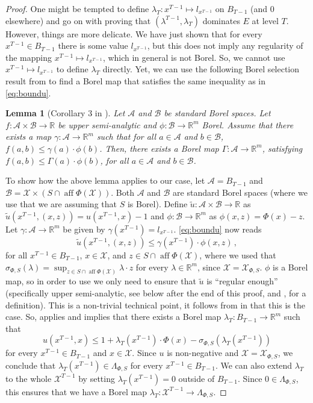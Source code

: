 \documentclass[10pt, a4paper]{article}
\newcommand{\A}{\mathcal A}
\newcommand{\B}{\mathcal B}
\newcommand{\LP}{\Lambda_{\Phi,S}}
\newcommand{\R}{\mathbb R}
\newcommand{\sP}{\sigma_{\Phi,S}}
\newcommand{\X}{\mathcal X}
\newcommand{\XP}{\X_{\Phi,S}}
\DeclareMathOperator{\aff}{aff}
\newtheorem{lemma}{Lemma}
\begin{document}
\begin{proof}
    One might be tempted to define $\lambda_T:x^{T-1}\mapsto l_{x^{T-1}}$ on $B_{T-1}$ (and $0$ elsewhere) and go on with proving that $(\lambda^{T-1},\lambda_T)$ dominates $E$ at level $T$. However, things are more delicate. We have just shown that for every $x^{T-1}\in B_{T-1}$ there is some value $l_{x^{T-1}}$, but this does not imply any regularity of the mapping $x^{T-1}\mapsto l_{x^{T-1}}$, which in general is not Borel. So, we cannot use $x^{T-1}\mapsto l_{x^{T-1}}$ to define $\lambda_T$ directly. Yet, we can use the following  Borel selection result from \cite{clerico2026borel} to find a Borel map that satisfies the same inequality as in \eqref{eq:boundu}. 
    \begin{lemma}[Corollary 3 in \citealt{clerico2026borel}]\label{lemma:gem}
        Let $\A$ and $\B$ be standard Borel spaces. Let $f:\A\times\B\to\R$ be upper semi-analytic and $\phi:\B\to\R^m$ Borel. Assume that there exists a map $\gamma:\A\to\R^m$ such that for all $a\in\A$ and $b\in\B$, $f(a,b)\leq \gamma(a)\cdot\phi(b)$. Then, there exists a Borel map $\Gamma:\A\to\R^m$, satisfying $f(a,b)\leq \Gamma(a)\cdot\phi(b)$, for all $a\in\A$ and $b\in\B$. 
    \end{lemma}
    To show how the above lemma applies to our case, let $\A = B_{T-1}$ and $\B = \X\times (S\cap \aff\Phi(\X))$. Both $\A$ and $\B$ are standard Borel spaces (where we use that we are assuming that $S$ is Borel). Define $\tilde u:\A\times\B\to\R$ as $\tilde u(x^{T-1}, (x,z)) = u(x^{T-1},x)-1$ and $\phi:\B\to\R^m$ as $\phi(x,z) = \Phi(x)-z$. Let $\gamma:\A\to\R^m$ be given by $\gamma(x^{T-1}) = l_{x^{T-1}}$. \eqref{eq:boundu} now reads
    $$\tilde u(x^{T-1}, (x,z))\leq \gamma(x^{T-1})\cdot\phi(x,z)\,,$$ for all $x^{T-1}\in B_{T-1}$, $x\in\X$, and $z\in S\cap\aff\Phi(\X)$, where we used that $\sP(\lambda) = \sup_{z\in S\cap\aff\Phi(\X)}\lambda\cdot z$ for every $\lambda\in\R^m$, since $\X = \XP$. $\phi$ is a Borel map, so in order to use  we only need to ensure that $\tilde u$ is ``regular enough'' (specifically upper semi-analytic, see below after the end of this proof, and , for a definition). This is a non-trivial technical point, it follows from  in   that this is the case. So,  applies and implies that there exists a Borel map $\lambda_T:B_{T-1}\to\R^m$ such that
    $$u(x^{T-1}, x)\leq 1 + \lambda_T(x^{T-1})\cdot\Phi(x) - \sP(\lambda_T(x^{T-1}))$$
    for every $x^{T-1}\in B_{T-1}$ and $x\in\X$. Since $u$ is non-negative and $\X=\XP$, we conclude that $\lambda_T(x^{T-1})\in\LP$ for every $x^{T-1}\in B_{T-1}$. We can also extend $\lambda_T$ to the whole $\X^{T-1}$ by setting $\lambda_T(x^{T-1}) = 0$ outside of $B_{T-1}$. Since $0\in\LP$, this ensures that we have a Borel map $\lambda_T:\X^{T-1}\to\LP$. 


\end{proof}
\end{document}
